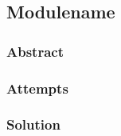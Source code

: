 \subsection{Modulename}
\def \kapitelautor {}

\subsubsection{Abstract}

\subsubsection{Attempts}

\subsubsection{Solution} %
